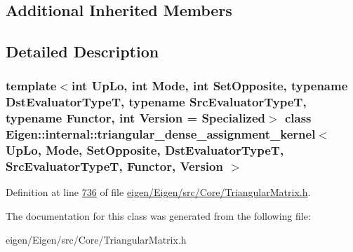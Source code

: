 \subsection*{Additional Inherited Members}


\subsection{Detailed Description}
\subsubsection*{template$<$int Up\+Lo, int Mode, int Set\+Opposite, typename Dst\+Evaluator\+TypeT, typename Src\+Evaluator\+TypeT, typename Functor, int Version = Specialized$>$\newline
class Eigen\+::internal\+::triangular\+\_\+dense\+\_\+assignment\+\_\+kernel$<$ Up\+Lo, Mode, Set\+Opposite, Dst\+Evaluator\+Type\+T, Src\+Evaluator\+Type\+T, Functor, Version $>$}



Definition at line \hyperlink{eigen_2_eigen_2src_2_core_2_triangular_matrix_8h_source_l00736}{736} of file \hyperlink{eigen_2_eigen_2src_2_core_2_triangular_matrix_8h_source}{eigen/\+Eigen/src/\+Core/\+Triangular\+Matrix.\+h}.



The documentation for this class was generated from the following file\+:\begin{DoxyCompactItemize}
\item 
eigen/\+Eigen/src/\+Core/\+Triangular\+Matrix.\+h\end{DoxyCompactItemize}
